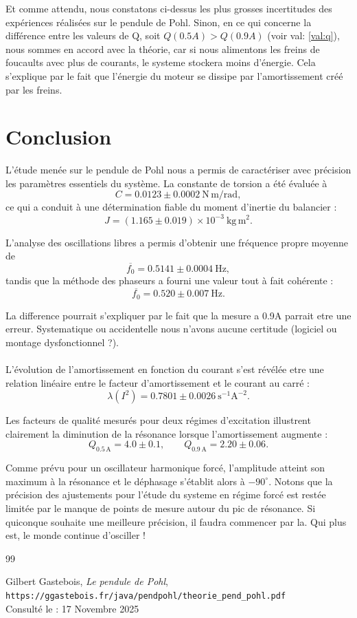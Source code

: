 Et comme attendu, nous constatons ci-dessus les plus grosses incertitudes des expériences réalisées sur le pendule de Pohl. Sinon, en ce qui concerne la différence entre les valeurs de Q, soit $Q\!\left(0.5A\right) > Q\!\left(0.9A\right)$  (voir val: \ref{val:q}), nous sommes en accord avec la théorie, car si nous alimentons les freins de foucaults avec plus de courants, le systeme stockera moins d'énergie. Cela s'explique par le fait que l'énergie du moteur se dissipe par l'amortissement créé par les freins.


\section{Conclusion}

L’étude menée sur le pendule de Pohl nous a permis de caractériser avec précision les paramètres essentiels du système. 
La constante de torsion a été évaluée à 
\[
C = 0.0123 \pm 0.0002~\mathrm{N\,m/rad},
\]
ce qui a conduit à une détermination fiable du moment d’inertie du balancier :
\[
J = (1.165 \pm 0.019)\times 10^{-3}~\mathrm{kg\,m^2}.
\]

L’analyse des oscillations libres a permis d’obtenir une fréquence propre moyenne de
\[
\overline{f_0} = 0.5141 \pm 0.0004~\mathrm{Hz},
\]
tandis que la méthode des phaseurs a fourni une valeur tout à fait cohérente :
\[
	\overline{f_0} = 0.520 \pm 0.007~\mathrm{Hz}.
\]

La difference pourrait s'expliquer par le fait que la mesure a 0.9A parrait etre une erreur. Systematique ou accidentelle nous n'avons aucune certitude (logiciel ou montage dysfonctionnel ?).
\\\\
L’évolution de l’amortissement en fonction du courant s’est révélée etre une relation linéaire entre le facteur d'amortissement et le courant au carré :
\[
\lambda(I^2) = 0.7801 \pm 0.0026~\mathrm{s^{-1}A^{-2}}.
\]

Les facteurs de qualité mesurés pour deux régimes d’excitation illustrent clairement la diminution de la résonance lorsque l’amortissement augmente :
\[
Q_{0.5\,\mathrm{A}} = 4.0 \pm 0.1, \qquad
Q_{0.9\,\mathrm{A}} = 2.20 \pm 0.06.
\]

Comme prévu pour un oscillateur harmonique forcé, l’amplitude atteint son maximum à la résonance et le déphasage s’établit alors à $-90^\circ$. 
Notons que la précision des ajustements pour l'étude du systeme en régime forcé est restée limitée par le manque de points de mesure autour du pic de résonance. Si quiconque souhaite une meilleure précision, il faudra commencer par la. Qui plus est, le monde continue d'osciller !
\begin{thebibliography}{99}

Gilbert Gastebois, \textit{Le pendule de Pohl},
\\
\texttt{https://ggastebois.fr/java/pendpohl/theorie\_pend\_pohl.pdf}
\\
Consulté le : 17 Novembre 2025

\end{thebibliography}

